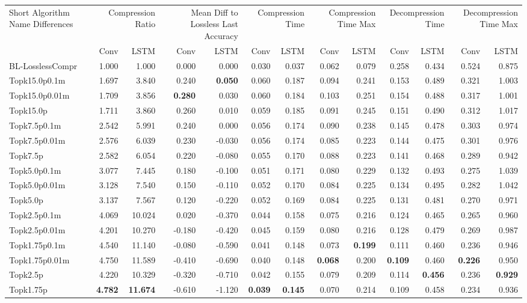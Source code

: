 \begin{tabular}{lrrrrrrrrrrrr}
\toprule
\multicolumn{1}{p{2.5cm}}{Short Algorithm Name Differences} & \multicolumn{2}{p{1.8cm}}{Compression Ratio} & \multicolumn{2}{p{1.8cm}}{Mean Diff to Lossless Last Accuracy} & \multicolumn{2}{p{1.8cm}}{Compression Time} & \multicolumn{2}{p{1.8cm}}{Compression Time Max} & \multicolumn{2}{p{1.8cm}}{Decompression Time} & \multicolumn{2}{p{1.8cm}}{Decompression Time Max} \\
 & Conv & LSTM & Conv & LSTM & Conv & LSTM & Conv & LSTM & Conv & LSTM & Conv & LSTM \\
\midrule
BL-LosslessCompr & 1.000 & 1.000 & 0.000 & 0.000 & 0.030 & 0.037 & 0.062 & 0.079 & 0.258 & 0.434 & 0.524 & 0.875 \\
Topk15.0p0.1m & 1.697 & 3.840 & 0.240 & \bfseries 0.050 & 0.060 & 0.187 & 0.094 & 0.241 & 0.153 & 0.489 & 0.321 & 1.003 \\
Topk15.0p0.01m & 1.709 & 3.856 & \bfseries 0.280 & 0.030 & 0.060 & 0.184 & 0.103 & 0.251 & 0.154 & 0.488 & 0.317 & 1.001 \\
Topk15.0p & 1.711 & 3.860 & 0.260 & 0.010 & 0.059 & 0.185 & 0.091 & 0.245 & 0.151 & 0.490 & 0.312 & 1.017 \\
Topk7.5p0.1m & 2.542 & 5.991 & 0.240 & 0.000 & 0.056 & 0.174 & 0.090 & 0.238 & 0.145 & 0.478 & 0.303 & 0.974 \\
Topk7.5p0.01m & 2.576 & 6.039 & 0.230 & -0.030 & 0.056 & 0.174 & 0.085 & 0.223 & 0.144 & 0.475 & 0.301 & 0.976 \\
Topk7.5p & 2.582 & 6.054 & 0.220 & -0.080 & 0.055 & 0.170 & 0.088 & 0.223 & 0.141 & 0.468 & 0.289 & 0.942 \\
Topk5.0p0.1m & 3.077 & 7.445 & 0.180 & -0.100 & 0.051 & 0.171 & 0.080 & 0.229 & 0.132 & 0.493 & 0.275 & 1.039 \\
Topk5.0p0.01m & 3.128 & 7.540 & 0.150 & -0.110 & 0.052 & 0.170 & 0.084 & 0.225 & 0.134 & 0.495 & 0.282 & 1.042 \\
Topk5.0p & 3.137 & 7.567 & 0.120 & -0.220 & 0.052 & 0.169 & 0.084 & 0.225 & 0.131 & 0.481 & 0.270 & 0.971 \\
Topk2.5p0.1m & 4.069 & 10.024 & 0.020 & -0.370 & 0.044 & 0.158 & 0.075 & 0.216 & 0.124 & 0.465 & 0.265 & 0.960 \\
Topk2.5p0.01m & 4.201 & 10.270 & -0.180 & -0.420 & 0.045 & 0.159 & 0.080 & 0.216 & 0.128 & 0.479 & 0.269 & 0.987 \\
Topk1.75p0.1m & 4.540 & 11.140 & -0.080 & -0.590 & 0.041 & 0.148 & 0.073 & \bfseries 0.199 & 0.111 & 0.460 & 0.236 & 0.946 \\
Topk1.75p0.01m & 4.750 & 11.589 & -0.410 & -0.690 & 0.040 & 0.148 & \bfseries 0.068 & 0.200 & \bfseries 0.109 & 0.460 & \bfseries 0.226 & 0.950 \\
Topk2.5p & 4.220 & 10.329 & -0.320 & -0.710 & 0.042 & 0.155 & 0.079 & 0.209 & 0.114 & \bfseries 0.456 & 0.236 & \bfseries 0.929 \\
Topk1.75p & \bfseries 4.782 & \bfseries 11.674 & -0.610 & -1.120 & \bfseries 0.039 & \bfseries 0.145 & 0.070 & 0.214 & 0.109 & 0.458 & 0.234 & 0.936 \\
\bottomrule
\end{tabular}
